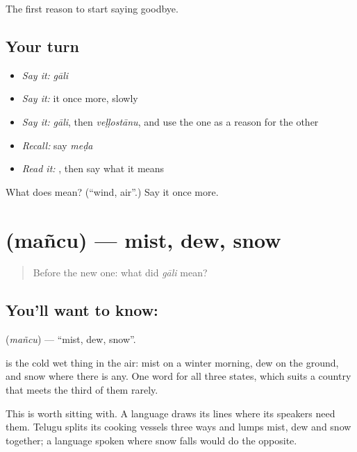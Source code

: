 \begin{grammarlens}[title={What you've built}]
The first reason to start saying goodbye.
\end{grammarlens}

\subsection*{Your turn}
\begin{itemize}
\raggedright
  \item \emph{Say it:} \emph{gāli}
  \item \emph{Say it:} it once more, slowly
  \item \emph{Say it:} \emph{gāli}, then \emph{veḷḷostānu}, and use the one as a reason for the other
  \item \emph{Recall:} say \emph{meḍa}
  \item \emph{Read it:} \textbf{}, then say what it means
\end{itemize}

\begin{tcolorbox}[breakable,colback=teal!4,colframe=teal!35!black,title={Before you move on}]
What does  mean? (\textquotedblleft{}wind, air\textquotedblright{}.) Say it once more.
\end{tcolorbox}
\section[\texorpdfstring{\te{మంచు} (mañcu)}{మంచు (mañcu)}]{ (mañcu) — mist, dew, snow}

\label{lesson:TE-C59-mist}



\begin{quote}
Before the new one: what did \emph{gāli} mean?
\end{quote}

\subsection*{You'll want to know: }
\textbf{} (\emph{mañcu}) — \textquotedblleft{}mist, dew, snow\textquotedblright{}.

 is the cold wet thing in the air: mist on a winter morning, dew on the ground, and snow where there is any. One word for all three states, which suits a country that meets the third of them rarely.

This is worth sitting with. A language draws its lines where its speakers need them. Telugu splits its cooking vessels three ways and lumps mist, dew and snow together; a language spoken where snow falls would do the opposite.

